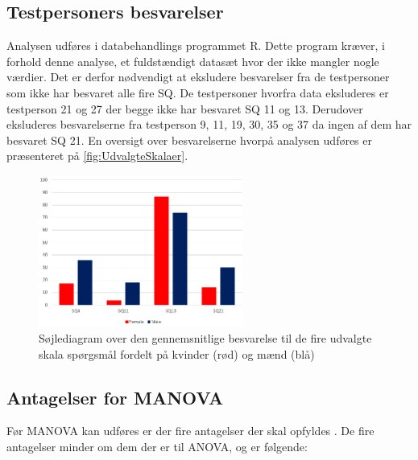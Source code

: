 \subsection{Testpersoners besvarelser}
%
Analysen udføres i databehandlings programmet R. Dette program kræver, i forhold denne analyse, et fuldstændigt datasæt hvor der ikke mangler nogle værdier. Det er derfor nødvendigt at eksludere besvarelser fra de testpersoner som ikke har besvaret alle fire SQ. De testpersoner hvorfra data eksluderes er testperson 21 og 27 der begge ikke har besvaret SQ 11 og 13. Derudover eksluderes besvarelserne fra testperson 9, 11, 19, 30, 35 og 37 da ingen af dem har besvaret SQ 21. \blankline
%
En oversigt over besvarelserne hvorpå analysen udføres er præsenteret på \autoref{fig:UdvalgteSkalaer}.
%
\begin{figure}[H]
\centering
\includegraphics[width = 0.6\textwidth]{Figure/DatabehandlingSkalaer/UdvalgteSkalaerKoen} 
\caption{Søjlediagram over den gennemsnitlige besvarelse til de fire udvalgte skala spørgsmål fordelt på kvinder (rød) og mænd (blå) }
\label{fig:UdvalgteSkalaer}
\end{figure}
\noindent
%
\subsection{Antagelser for MANOVA}
Før MANOVA kan udføres er der fire antagelser der skal opfyldes \parencite[s. 717]{FieldMANOVA}. De fire antagelser minder om dem der er til ANOVA, og er følgende: 

